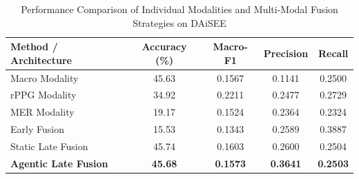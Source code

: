 \begin{table}[htbp]
\centering
\caption{Performance Comparison of Individual Modalities and Multi-Modal Fusion Strategies on DAiSEE}
\label{tab:engagement_results}
\begin{tabular}{lcccc}
\hline
\textbf{Method / Architecture} & \textbf{Accuracy (\%)} & \textbf{Macro-F1} & \textbf{Precision} & \textbf{Recall} \\
\hline
Macro Modality & 45.63 & 0.1567 & 0.1141 & 0.2500 \\
rPPG Modality & 34.92 & 0.2211 & 0.2477 & 0.2729 \\
MER Modality & 19.17 & 0.1524 & 0.2364 & 0.2324 \\
Early Fusion & 15.53 & 0.1343 & 0.2589 & 0.3887 \\
Static Late Fusion & 45.74 & 0.1603 & 0.2600 & 0.2504 \\
\textbf{Agentic Late Fusion} & \textbf{45.68} & \textbf{0.1573} & \textbf{0.3641} & \textbf{0.2503} \\
\hline
\end{tabular}
\end{table}
